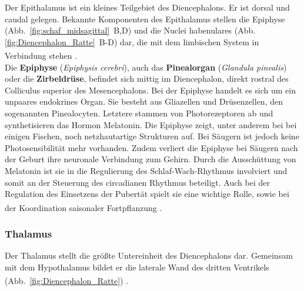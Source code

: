 \documentclass[12pt,a4paper,pdftex]{article}
\begin{document}
Der Epithalamus ist ein kleines Teilgebiet des Diencephalons. Er ist dorsal und caudal gelegen. Bekannte Komponenten des Epithalamus stellen die Epiphyse (Abb.~\ref{fig:schaf_midsagittal}~B,D) und die Nuclei habenulares (Abb.\ref{fig:Diencephalon_Ratte}~B-D) dar, die mit dem limbischen System in Verbindung stehen \textsuperscript{\cite[12]{crossman2014neuroanatomy}}.\\

\noindent Die \textbf{Epiphyse} (\textit{Epiphysis cerebri}), auch das \textbf{Pinealorgan} (\textit{Glandula pinealis}) oder die \textbf{Zirbeldrüse}, befindet sich mittig im Diencephalon, direkt rostral des Colliculus superior des Mesencephalons. Bei der Epiphyse handelt es sich um ein unpaares endokrines Organ.
Sie besteht aus Gliazellen und Drüsenzellen, den sogenannten Pinealocyten. Letztere stammen von Photorezeptoren ab und synthetisieren das Hormon Melatonin. Die Epiphyse zeigt, unter anderem  bei bei einigen Fischen, noch netzhautartige Strukturen auf. Bei Säugern ist jedoch keine Photosensibilität mehr vorhanden. Zudem verliert die Epiphyse bei Säugern nach der Geburt ihre neuronale Verbindung zum Gehirn. Durch die Ausschüttung von Melatonin ist sie in die Regulierung des Schlaf-Wach-Rhythmus involviert und somit an der Steuerung des circadianen Rhythmus beteiligt. Auch bei der Regulation des Einsetzens der Pubertät spielt sie eine wichtige Rolle, sowie bei der Koordination saisonaler Fortpflanzung \textsuperscript{\cite[13]{penzlin2005tierphys}}.

\subsubsection{Thalamus}
\label{subsubsec:Thalamus} 

Der Thalamus stellt die größte Untereinheit des Diencephalons dar. Gemeinsam mit dem Hypothalamus bildet er die laterale Wand des dritten Ventrikels (Abb.~\ref{fig:Diencephalon_Ratte})  \textsuperscript{\cite[12]{crossman2014neuroanatomy}}. \\
\end{document}
